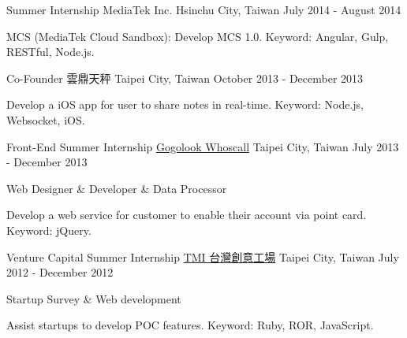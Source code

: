 \begin{cventries}
  \cventry
    {Summer Internship} %
    {MediaTek Inc.} %
    {Hsinchu City, Taiwan} %
    {July 2014 - August 2014} %
    {
      \begin{cvitems} %
        \item {MCS (MediaTek Cloud Sandbox): Develop MCS 1.0. Keyword: Angular, Gulp, RESTful, Node.js.}
      \end{cvitems}
    }

  \cventry
    {Co-Founder} %
    {雲鼎天秤} %
    {Taipei City, Taiwan} %
    {October 2013 - December 2013} %
    {
      \begin{cvitems} %
        \item {Develop a iOS app for user to share notes in real-time. Keyword: Node.js, Websocket, iOS.}
      \end{cvitems}
    }

  \cventry
    {Front-End Summer Internship} %
    {\href{https://whoscall.com}{Gogolook Whoscall}} %
    {Taipei City, Taiwan} %
    {July 2013 - December 2013} %
    {
      \begin{cvitems} %
        \item {Web Designer \& Developer \& Data Processor}
        \item {Develop a web service for customer to enable their account via point card. Keyword: jQuery.}
        \end{cvitems}
    }

  \cventry
    {Venture Capital Summer Internship} %
    {\href{http://tmi.vc}{TMI 台灣創意工場}} %
    {Taipei City, Taiwan} %
    {July 2012 - December 2012} %
    {
      \begin{cvitems} %
        \item {Startup Survey \& Web development}
        \item {Assist startups to develop POC features. Keyword: Ruby, ROR, JavaScript.}
      \end{cvitems}
    }

\end{cventries}
